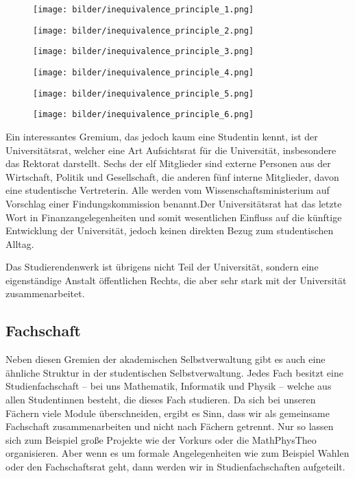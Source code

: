 \begin{figure*}[b]
    \centering
    \begin{subfigure}{.3\textwidth}
	\texttt{[image: bilder/inequivalence\_principle\_1.png]}
	\vspace{7mm}
    \end{subfigure}
    \begin{subfigure}{.3\textwidth}
	\texttt{[image: bilder/inequivalence\_principle\_2.png]}
	\vspace{7mm}
    \end{subfigure}
    \begin{subfigure}{.3\textwidth}
	\texttt{[image: bilder/inequivalence\_principle\_3.png]}
	\vspace{7mm}
    \end{subfigure}
    \begin{subfigure}{.3\textwidth}
	\texttt{[image: bilder/inequivalence\_principle\_4.png]}
    \end{subfigure}
    \begin{subfigure}{.3\textwidth}
	\texttt{[image: bilder/inequivalence\_principle\_5.png]}
    \end{subfigure}
    \begin{subfigure}{.3\textwidth}
	\texttt{[image: bilder/inequivalence\_principle\_6.png]}
    \end{subfigure}
\end{figure*}
Ein interessantes Gremium, das jedoch kaum eine Studentin kennt, ist der Universitätsrat, welcher eine Art Aufsichtsrat für die Universität, insbesondere das Rektorat darstellt. Sechs der elf Mitglieder sind externe Personen aus der Wirtschaft, Politik und Gesellschaft, die anderen fünf interne Mitglieder, davon eine studentische Vertreterin. Alle werden vom Wissenschaftsministerium auf Vorschlag einer Findungskommission benannt.Der Universitätsrat hat das letzte Wort in Finanzangelegenheiten und somit wesentlichen Einfluss auf die künftige Entwicklung der Universität, jedoch keinen direkten Bezug zum studentischen Alltag.



Das Studierendenwerk ist übrigens nicht Teil der Universität, sondern eine eigenständige Anstalt öffentlichen Rechts, die aber sehr stark mit der Universität zusammenarbeitet.

\subsection{Fachschaft}
Neben diesen Gremien der akademischen Selbstverwaltung gibt es auch eine ähnliche Struktur in der studentischen Selbstverwaltung. Jedes Fach besitzt eine Studienfachschaft -- bei uns Mathematik, Informatik und Physik -- welche aus allen Studentinnen besteht, die dieses Fach studieren. Da sich bei unseren Fächern viele Module überschneiden, ergibt es Sinn, dass wir als gemeinsame Fachschaft zusammenarbeiten und nicht nach Fächern getrennt. Nur so lassen sich zum Beispiel große Projekte wie der Vorkurs oder die MathPhysTheo organisieren. Aber wenn es um formale Angelegenheiten wie zum Beispiel Wahlen oder den Fachschaftsrat geht, dann werden wir in Studienfachschaften aufgeteilt.

